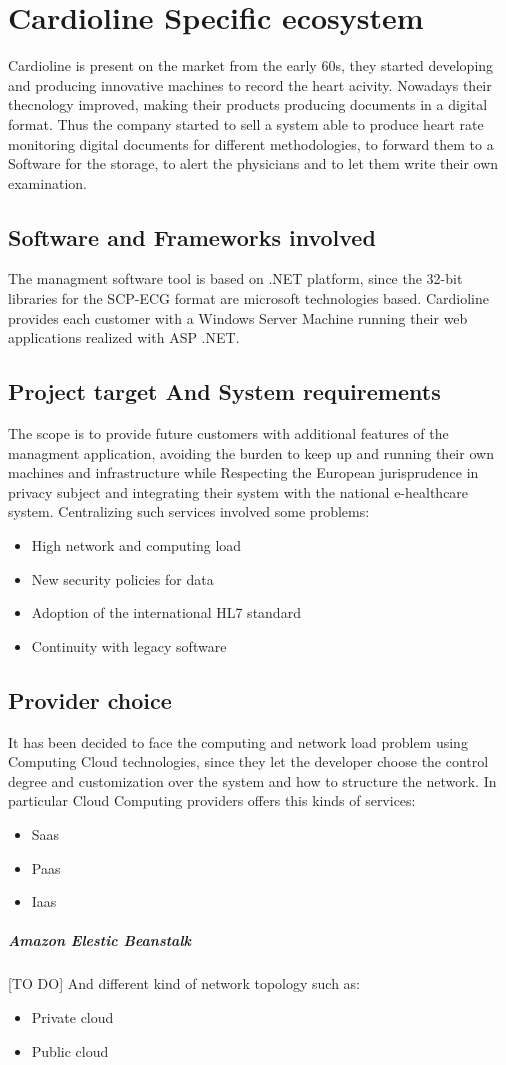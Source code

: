 \chapter{Cardioline Specific ecosystem}
Cardioline is present on the market from the early 60s, they started developing and producing innovative machines to record the heart acivity. Nowadays their thecnology improved, making their products producing documents in a digital format.
Thus the company started to sell a system able to produce heart rate monitoring digital documents for different methodologies, to forward them to a Software for the storage, to alert the physicians and to let them write their own examination.
\section{Software and Frameworks involved}
The managment software tool is based on .NET platform, since the 32-bit libraries for the SCP-ECG format are microsoft technologies based.
Cardioline provides each customer with a Windows Server Machine running their web applications realized with ASP .NET.
\section{Project target And System requirements}
The scope is to provide future customers with additional features of the managment application, avoiding the burden to keep up and running their own machines and infrastructure while Respecting the European jurisprudence in privacy subject and integrating their system with the national e-healthcare system.
Centralizing such services involved some problems:
\begin{itemize}
    \item High network and computing load
    \item New security policies for data
    \item Adoption of the international HL7 standard
    \item Continuity with legacy software
\end{itemize}
\section{Provider choice}
It has been decided to face the computing and network load problem using Computing Cloud technologies, since they let the developer choose the control degree and customization over the system and how to structure the network.
In particular Cloud Computing providers offers this kinds of services:
\begin{itemize}
    \item Saas
    \item Paas
    \item Iaas
\end{itemize}
\paragraph{Amazon Elestic Beanstalk}
[TO DO]
And different kind of network topology such as:
\begin{itemize}
    \item Private cloud
    \item Public cloud
\end{itemize}

